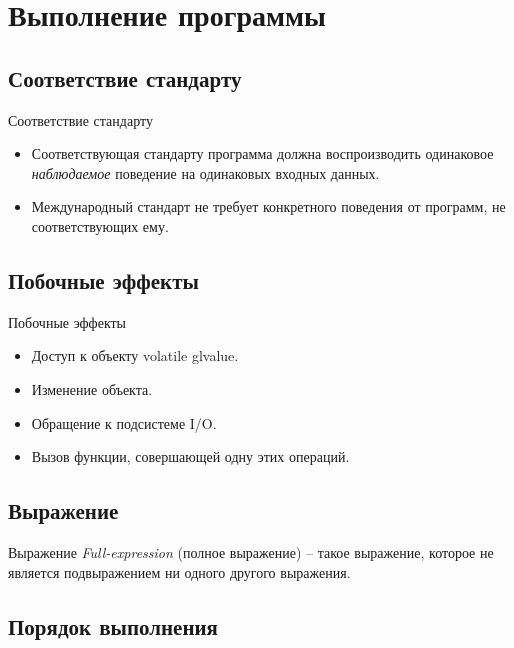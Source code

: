 \documentclass[xetex,mathserif,serif,10pt]{beamer}
\begin{document}
    \section{Выполнение программы}
    \subsection{Соответствие стандарту}
    \begin{frame}{Соответствие стандарту}
        \begin{itemize}
            \item Соответствующая стандарту программа должна воспроизводить одинаковое \textit{наблюдаемое} поведение
                на одинаковых входных данных.
            \item Международный стандарт не требует конкретного поведения от программ, не соответствующих ему.
        \end{itemize}
    \end{frame}
    \subsection{Побочные эффекты}
    \begin{frame}{Побочные эффекты}
        \begin{itemize}
            \item Доступ к объекту volatile glvalue.
            \item Изменение объекта.
            \item Обращение к подсистеме I/O.
            \item Вызов функции, совершающей одну этих операций.
        \end{itemize}
    \end{frame}
    \subsection{Выражение}
    \begin{frame}{Выражение}
        \textit{Full-expression} (полное выражение) -- такое выражение, которое не является подвыражением ни одного другого выражения.
    \end{frame}
    \subsection{Порядок выполнения}
\end{document}
